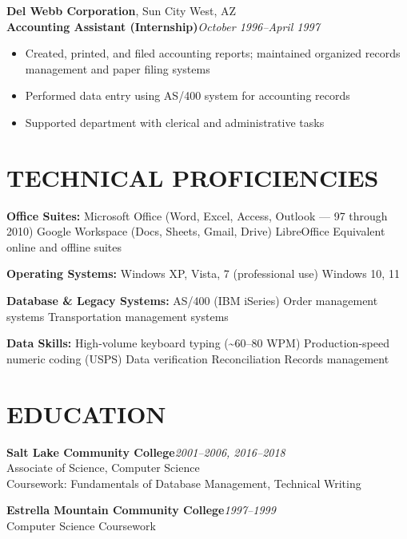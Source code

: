 \documentclass[9pt,letterpaper]{extarticle}
\begin{document}
\vspace{5pt}
\noindent\textbf{Del Webb Corporation}, Sun City West, AZ\\
\textbf{Accounting Assistant (Internship)}\hfill\textit{October 1996--April 1997}
\begin{itemize}
  \item Created, printed, and filed accounting reports; maintained organized records management and paper filing systems
  \item Performed data entry using AS/400 system for accounting records
  \item Supported department with clerical and administrative tasks
\end{itemize}

\section*{TECHNICAL PROFICIENCIES}

\noindent\textbf{Office Suites:} Microsoft Office (Word, Excel, Access, Outlook --- 97 through 2010) \textbar{} Google Workspace (Docs, Sheets, Gmail, Drive) \textbar{} LibreOffice \textbar{} Equivalent online and offline suites

\noindent\textbf{Operating Systems:} Windows XP, Vista, 7 (professional use) \textbar{} Windows 10, 11

\noindent\textbf{Database \& Legacy Systems:} AS/400 (IBM iSeries) \textbar{} Order management systems \textbar{} Transportation management systems

\noindent\textbf{Data Skills:} High-volume keyboard typing (\textasciitilde{}60--80 WPM) \textbar{} Production-speed numeric coding (USPS) \textbar{} Data verification \textbar{} Reconciliation \textbar{} Records management

\section*{EDUCATION}

\noindent\textbf{Salt Lake Community College}\hfill\textit{2001--2006, 2016--2018}\\
Associate of Science, Computer Science\\
Coursework: Fundamentals of Database Management, Technical Writing

\noindent\textbf{Estrella Mountain Community College}\hfill\textit{1997--1999}\\
Computer Science Coursework
\end{document}

